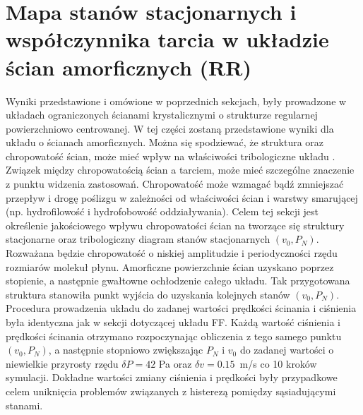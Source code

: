 \documentclass[12pt,a4paper,openright]{report} %
\begin{document}
\section{Mapa stanów stacjonarnych i współczynnika tarcia w układzie ścian amorficznych (RR)}
%
Wyniki przedstawione i omówione w poprzednich sekcjach, były prowadzone w układach ograniczonych ścianami krystalicznymi o strukturze regularnej powierzchniowo centrowanej. W tej części zostaną przedstawione wyniki dla układu o ścianach amorficznych.
Można się spodziewać, że struktura oraz chropowatość ścian, może mieć wpływ na właściwości tribologiczne układu \cite{Jab2006, Priez2007, sofos2009}. Związek między chropowatością ścian a tarciem, może mieć szczególne znaczenie z punktu widzenia zastosowań. 
%
%
Chropowatość może wzmagać bądź zmniejszać przepływ i drogę poślizgu w zależności od właściwości ścian i warstwy smarującej (np. hydrofilowość i hydrofobowość oddziaływania). Celem tej sekcji jest określenie jakościowego wpływu chropowatości ścian na tworzące się struktury stacjonarne oraz tribologiczny diagram stanów stacjonarnych $(v_0, P_N)$. Rozważana będzie chropowatość o niskiej amplitudzie i periodyczności rzędu rozmiarów molekuł płynu.   
%
%
Amorficzne powierzchnie ścian uzyskano poprzez stopienie, a następnie gwałtowne ochłodzenie całego układu. Tak przygotowana struktura stanowiła punkt wyjścia do uzyskania kolejnych stanów $(v_0, P_N)$. Procedura prowadzenia układu do zadanej wartości prędkości ścinania i ciśnienia była identyczna jak w sekcji dotyczącej układu FF. Każdą wartość ciśnienia i prędkości ścinania otrzymano rozpoczynając obliczenia z tego samego punktu $(v_0, P_N)$, a następnie stopniowo zwiększając $P_N$ i $v_0$ do zadanej wartości o niewielkie przyrosty rzędu $\delta P=42$ Pa oraz $\delta v=0.15$~m/s co 10 kroków symulacji. Dokładne wartości zmiany ciśnienia i prędkości były przypadkowe celem uniknięcia problemów związanych z histerezą pomiędzy sąsiadującymi stanami.\\
%
\end{document}
